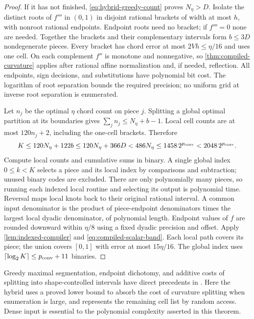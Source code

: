 \begin{proof}
If it has not finished, \eqref{eq:hybrid-greedy-count} proves
$N_\eta>D$. Isolate the distinct roots of $f'''$ in $(0,1)$ in
disjoint rational brackets of width at most $h$, with nonroot rational
endpoints. Endpoint roots need no bracket; if $f'''=0$ none are needed.
Together the brackets and their complementary intervals form
$b\le3D$ nondegenerate pieces. Every bracket has chord error at most
$2Vh\le\eta/16$ and uses one cell. On each complement $f''$ is
monotone and nonnegative, so \cref{thm:compiled-curvature} applies
after rational affine normalization and, if needed, reflection.
All endpoints, sign decisions, and substitutions have polynomial bit
cost. The logarithm of root separation bounds the required precision;
no uniform grid at inverse root separation is enumerated.

Let $n_j$ be the optimal $\eta$ chord count on piece $j$. Splitting
a global optimal partition at its boundaries gives
$\sum_jn_j\le N_\eta+b-1$. Local cell counts are at most
$120n_j+2$, including the one-cell brackets. Therefore
\begin{equation}\label{eq:hybrid-total-cells}
 K\le120N_\eta+122b\le120N_\eta+366D
 <486N_\eta\le1458\,2^{p_{\mathrm{conv}}}<2048\,2^{p_{\mathrm{conv}}}.
\end{equation}
Compute local counts and cumulative sums in binary. A single global
index $0\le k<K$ selects a piece and its local index by comparisons
and subtraction; unused binary codes are excluded. There are only
polynomially many pieces, so running each indexed local routine and
selecting its output is polynomial time. Reversal maps local knots
back to their original rational interval. A common input denominator
is the product of piece-endpoint denominators times the largest local
dyadic denominator, of polynomial length. Endpoint values of $f$ are
rounded downward within $\eta/8$ using a fixed dyadic precision and
offset. Apply \cref{lem:indexed-compiler} and
\eqref{eq:compiled-scalar-band}. Each local path covers its piece;
the union covers $[0,1]$ with error at most $15\eta/16$.
The global index uses $\lceil\log_2K\rceil\le p_{\mathrm{conv}}+11$ binaries.
\end{proof}

Greedy maximal segmentation, endpoint dichotomy, and additive costs of
splitting into shape-controlled intervals have direct precedents in
\citet[Sections 3--5]{codsi2021}. Here the hybrid uses a proved lower
bound to absorb the cost of curvature splitting when enumeration is
large, and represents the remaining cell list by random access. Dense
input is essential to the polynomial complexity asserted in this theorem.

